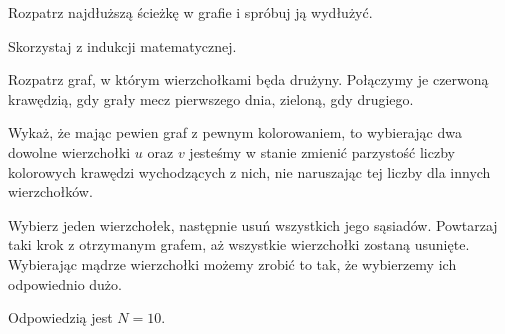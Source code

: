 
\begin{hints_list}
	\item Rozpatrz najdłuższą ścieżkę w grafie i spróbuj ją wydłużyć.
	\item Skorzystaj z indukcji matematycznej.
	\item Rozpatrz graf, w którym wierzchołkami będa drużyny. Połączymy je czerwoną krawędzią, gdy grały mecz pierwszego dnia, zieloną, gdy drugiego.
	\item Wykaż, że mając pewien graf z pewnym kolorowaniem, to wybierając dwa dowolne wierzchołki $u$ oraz $v$ jesteśmy w stanie zmienić parzystość liczby kolorowych krawędzi wychodzących z nich, nie naruszając tej liczby dla innych wierzchołków.
	\item Wybierz jeden wierzchołek, następnie usuń wszystkich jego sąsiadów. Powtarzaj taki krok z otrzymanym grafem, aż wszystkie wierzchołki zostaną usunięte. Wybierając mądrze wierzchołki możemy zrobić to tak, że wybierzemy ich odpowiednio dużo.
	\item Odpowiedzią jest $N = 10$.
\end{hints_list}